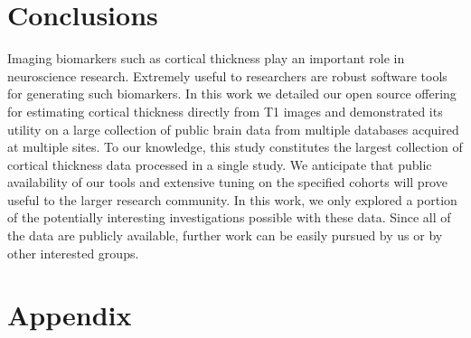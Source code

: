 \section{Conclusions}

Imaging biomarkers such as cortical thickness play an 
important role in neuroscience research.  Extremely useful to
researchers are robust software tools for generating such 
biomarkers.  In this work we detailed our open source offering for estimating
cortical thickness directly from T1 images and demonstrated
its utility on a large collection of public brain data from
multiple databases acquired at multiple sites.  To our knowledge,
this study constitutes the largest collection of cortical
thickness data processed in a single study.  
We anticipate that public availability of our tools and extensive tuning on
the specified cohorts will prove useful to the larger
research community.   In this work, we only explored a portion of the potentially
interesting investigations possible with these data.
Since all of the data are publicly available, further work can
be easily pursued by us or by other interested groups.


\section*{Appendix}

